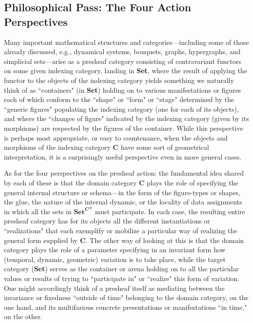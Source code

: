\documentclass[11pt]{book}
\theoremstyle{definition}
\theoremstyle{definition}
\theoremstyle{definition}
\theoremstyle{theorem}
\theoremstyle{definition}
\begin{document}
\subsection{Philosophical Pass: The Four Action Perspectives}
Many important mathematical structures and categories---including some of those already discussed, e.g., dynamical systems, bouquets, graphs, hypergraphs, and simplicial sets---arise as a presheaf category consisting of contravariant functors on some given indexing category, landing in \textbf{Set}, where the result of applying the functor to the objects of the indexing category yields something we naturally think of as ``containers" (in \textbf{Set}) holding on to various manifestations or figures each of which conform to the ``shape" or ``form" or ``stage" determined by the ``generic figures" populating the indexing category (one for each of its objects), and where the ``changes of figure" indicated by the indexing category (given by its morphisms) are respected by the figures of the container. While this perspective is perhaps most appropriate, or easy to countenance, when the objects and morphisms of the indexing category $\textbf{C}$ have some sort of geometrical interpretation, it is a surprisingly useful perspective even in more general cases. \par
As for the four perspectives on the presheaf action: the fundamental idea shared by each of these is that the domain category \textbf{C} plays the role of specifying the general internal structure or schema---in the form of the figure-types or shapes, the glue, the nature of the internal dynamic, or the locality of data assignments in which all the sets in $\textbf{Set}^{\textbf{C}^{op}}$ must participate. In each case, the resulting entire presheaf category has for its objects all the different instantiations or ``realizations" that each exemplify or mobilize a particular way of realizing the general form supplied by \textbf{C}. The other way of looking at this is that the domain category plays the role of a parameter specifying in an invariant form how (temporal, dynamic, geometric) variation is to take place, while the target category (\textbf{Set}) serves as the container or arena holding on to all the particular values or results of trying to ``participate in" or ``realize" this form of variation. One might accordingly think of a presheaf itself as mediating between the invariance or fixedness ``outside of time" belonging to the domain category, on the one hand, and its multifarious concrete presentations or manifestations ``in time," on the other.  \par   
\end{document}
